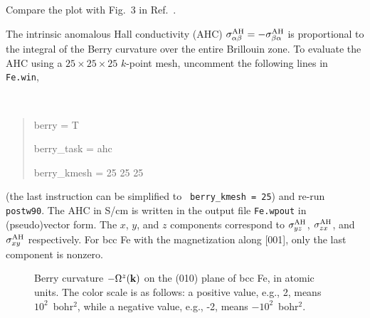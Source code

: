 \documentclass[a4paper,11pt,twoside]{article}
\begin{document}
Compare the plot with Fig.~3 in Ref.~\cite{yao-prl04}.

The intrinsic anomalous Hall conductivity (AHC) $\sigma^{\rm
  AH}_{\alpha\beta}=-\sigma^{\rm AH}_{\beta\alpha}$ is proportional to
the integral of the Berry curvature over the entire Brillouin zone.
To evaluate the AHC using a $25\times 25\times 25$ $k$-point mesh,
uncomment the following lines in {\tt Fe.win}, 
{\tt
\begin{quote}
berry = T

berry\_task = ahc                

berry\_kmesh = 25 25 25

\end{quote} } 
(the last instruction can be simplified to {\tt
berry\_kmesh = 25}) and re-run {\tt postw90}.  The AHC in S/cm
is written in the output file {\tt Fe.wpout} in (pseudo)vector
form. The $x$, $y$, and $z$ components correspond to $\sigma^{\rm
  AH}_{yz}$, $\sigma^{\rm AH}_{zx}$, and $\sigma^{\rm AH}_{xy}$
respectively. For bcc Fe with the magnetization along [001], only the
last component is nonzero.

\begin{figure}[h]
\begin{center}
\caption{Berry curvature $-\Omega^z({\bf k})$ on the (010) plane of
  bcc Fe, in atomic units.  The color scale is as follows:
  a positive value, e.g., 2, means $10^2$~bohr$^2$, while a negative value,
  e.g., -2, means $-10^2$~bohr$^2$.}
\label{fig:fe-curv-slice}
\end{center}
\end{figure}
\end{document}
